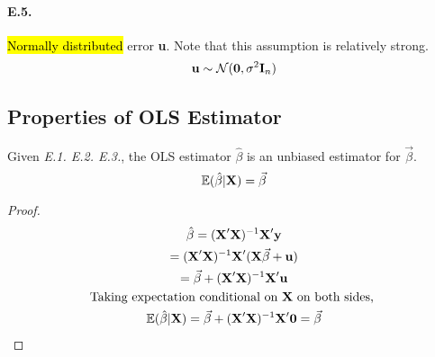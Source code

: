 \documentclass[]{article}
\begin{document}
    		\paragraph{E.5.} \hl{Normally distributed} error \textbf{u}. Note that this assumption is relatively strong.
    		\[
    			\textbf{u} \sim \mathcal{{N}}(\textbf{0}, \sigma^2 \textbf{I}_n)
    		\]
    	\subsection{Properties of OLS Estimator}
    	\begin{theorem}
    		Given \emph{E.1. E.2. E.3.}, the OLS estimator $\hat{\beta}$ is an unbiased estimator for $\vec{\beta}$.
    		\[
    			\mathbb{E}({\hat{\beta}|\textbf{X}}) = \vec{\beta}
    		\]
    	\end{theorem}
    	\begin{proof}
    		\begin{gather*}
    			\hat{\beta} = (\textbf{X}'\textbf{X})^{-1} \textbf{X}' \textbf{y} \\
    			= (\textbf{X}'\textbf{X})^{-1} \textbf{X}' (\textbf{X}\vec{\beta} + \textbf{u}) \\
    			= \vec{\beta} + (\textbf{X}'\textbf{X})^{-1} \textbf{X}' \textbf{u} \\
    			\text{{Taking expectation conditional on \textbf{X} on both sides, }}\\
    			\mathbb{E}({\hat{\beta}|\textbf{X}}) = \vec{\beta} + (\textbf{X}'\textbf{X})^{-1} \textbf{X}' \textbf{0} 
    			= \vec{\beta}
    		\end{gather*}
    	\end{proof}
    	
\end{document}
